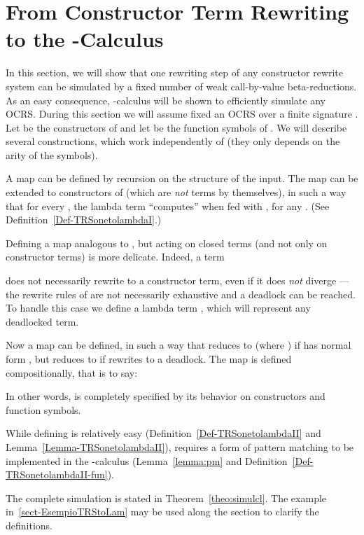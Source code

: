 \documentclass{LMCS}
\newenvironment{varitemize}
{
\begin{list}{\labelitemi}
{\setlength{\itemsep}{0.0mm}
 \setlength{\topsep}{0.0mm}
 \setlength{\parindent}{0.0mm}
 \setlength{\parskip}{0.0mm}
 \setlength{\parsep}{0.0mm}
 \setlength{\partopsep}{0.0mm}
 \setlength{\leftmargin}{15pt}
 \setlength{\labelsep}{5pt}
 \setlength{\labelwidth}{10pt}}}
{
 \end{list} 
}
\newcounter{number}
\begin{document}
\section{From Constructor Term Rewriting to the -Calculus}\label{Sect:CTR2L}
In this section, we will show that one rewriting step of any constructor rewrite
system can be simulated by a fixed number of weak call-by-value beta-reductions. As 
an easy consequence, -calculus will be shown to efficiently simulate any
OCRS. During this section we will assume fixed an  OCRS   over a finite signature . Let
 be the constructors of 
and let  be the function symbols of
. We will describe several constructions, which work independently of  (they only depends on the arity of the symbols).
\begin{varitemize}
\item
  A map  can
  be defined by recursion on the structure of the input. The map can be
  extended to constructors of  (which are \emph{not} terms by themselves),
  in such a way that for every , the lambda term 
  ``computes'' 
  when fed with ,
  for any . (See Definition~\ref{Def-TRSonetolambdaI}.)
\item
  Defining a map analogous to , but acting on closed terms (and not only on 
  constructor terms) is more delicate. Indeed, a term 
   
  does not necessarily rewrite to a constructor term,
  even if it does \emph{not} diverge ---
  the rewrite rules of  are not necessarily exhaustive and a deadlock
  can be reached. To handle this case we define a lambda term , which 
  will represent any deadlocked term.
\item
  Now a map 
  can be defined, in such a way that  reduces
  to  (where ) if 
   has normal form , but  reduces to 
  if  rewrites to a deadlock. The map 
  is defined compositionally, that is to say:
  
  In other words,  is completely specified by its
  behavior on constructors and function symbols.
\item
  While defining  is relatively easy 
  (Definition~\ref{Def-TRSonetolambdaII} and Lemma~\ref{Lemma-TRSonetolambdaII}),
   requires a form of pattern matching
  to be implemented in the -calculus (Lemma~\ref{lemma:pm} and Definition~\ref{Def-TRSonetolambdaII-fun}).
\item The complete simulation is stated in Theorem~\ref{theo:simulcl}. The example in~\ref{sect-EsempioTRStoLam} may be used along the section to clarify the definitions.
\end{varitemize}
\end{document}
